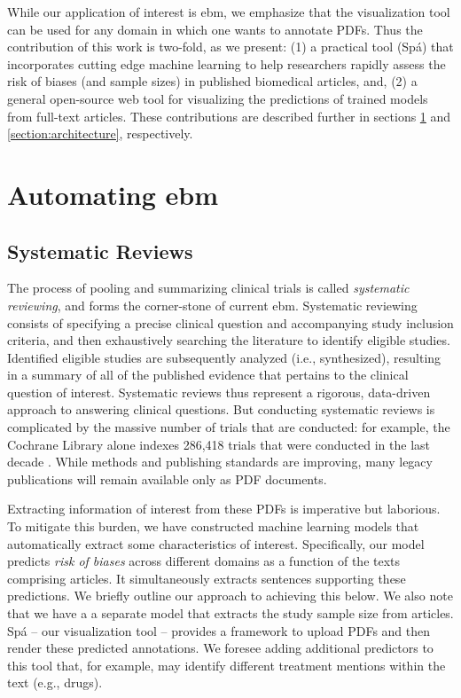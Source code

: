 \documentclass[runningheads,a4paper]{llncs}
\begin{document}
While our application of interest is \ac{ebm}, we emphasize that the visualization tool can be used for any domain in which one wants to annotate PDFs. 
Thus the contribution of this work is two-fold, as we present:
(1) a practical tool (Spá) that incorporates cutting edge machine learning to help researchers rapidly assess the risk of biases (and sample sizes) in published biomedical articles, and,
(2) a general open-source web tool for visualizing the predictions of trained models from full-text articles.
These contributions are described further in sections \ref{section:EBM-ML} and \ref{section:architecture}, respectively.


\section{Automating \acl{ebm}}
\label{section:EBM-ML}

\subsection{Systematic Reviews}
The process of pooling and summarizing clinical trials is called \emph{systematic reviewing}, and forms the corner-stone of current \ac{ebm}.
Systematic reviewing consists of specifying a precise clinical question and accompanying study inclusion criteria, and then exhaustively searching the literature to identify eligible studies. 
Identified eligible studies are subsequently analyzed (i.e., synthesized), resulting in a summary of all of the published evidence that pertains to the clinical question of interest.
Systematic reviews thus represent a rigorous, data-driven approach to answering clinical questions. 
But conducting systematic reviews is complicated by the massive number of trials that are conducted: for example, the Cochrane Library alone indexes 286,418 trials that were conducted in the last decade \cite{valkenhoef2012}.
While methods and publishing standards are improving, many legacy publications will remain available only as PDF documents. 

Extracting information of interest from these PDFs is imperative but laborious. 
To mitigate this burden, we have constructed machine learning models that automatically extract some characteristics of interest.
Specifically, our model predicts {\it risk of biases} across different domains as a function of the texts comprising articles. 
It simultaneously extracts sentences supporting these predictions. 
We briefly outline our approach to achieving this below. 
We also note that we have a a separate model that extracts the study sample size from articles. 
Spá -- our visualization tool -- provides a framework to upload PDFs and then render these predicted annotations. 
We foresee adding additional predictors to this tool that, for example, may identify different treatment mentions within the text (e.g., drugs). 
\end{document}
